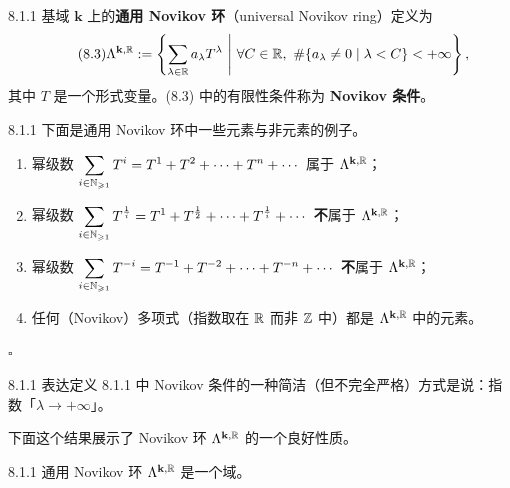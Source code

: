 \begin{wdefn}{8.1.1}
  基域 $\mathbf{k}$ 上的\textbf{通用 Novikov 环}（universal Novikov ring）定义为
  \begin{equation}\tag{8.3}
    \Lambda^{\mathbf{k},\R}:=\left\{\sum_{\lambda\in\R}a_\lambda T^\lambda
      \ \middle|\
      \forall C\in\R,\ \#\{a_\lambda\ne0\mid\lambda<C\}<+\infty\right\},
  \end{equation}
  其中 $T$ 是一个形式变量。(8.3) 中的有限性条件称为 \textbf{Novikov 条件}。
\end{wdefn}

\begin{wexam}{8.1.1}
  下面是通用 Novikov 环中一些元素与非元素的例子。
  \begin{enumerate}[label=(\roman*)]
    \item 幂级数 $\displaystyle\sum_{i\in\mathbb{N}_{\geqslant1}}T^i
          =T^1+T^2+\cdots+T^n+\cdots$ 属于 $\Lambda^{\mathbf{k},\mathbb{R}}$；
    \item 幂级数 $\displaystyle\sum_{i\in\mathbb{N}_{\geqslant1}}T^{\frac1i}
          =T^1+T^{\frac12}+\cdots+T^{\frac1i}+\cdots$ \textbf{不}属于
          $\Lambda^{\mathbf{k},\mathbb{R}}$；
    \item 幂级数 $\displaystyle\sum_{i\in\mathbb{N}_{\geqslant1}}T^{-i}
          =T^{-1}+T^{-2}+\cdots+T^{-n}+\cdots$ \textbf{不}属于 $\Lambda^{\mathbf{k},\mathbb{R}}$；
    \item 任何（Novikov）多项式（指数取在 $\mathbb{R}$ 而非 $\mathbb{Z}$ 中）都是 $\Lambda^{\mathbf{k},\mathbb{R}}$
          中的元素。
  \end{enumerate}
  \hfill$\square$
\end{wexam}

\begin{wrem}{8.1.1}
  表达定义 8.1.1 中 Novikov 条件的一种简洁（但不完全严格）方式是说：指数「$\lambda\to+\infty$」。
\end{wrem}

下面这个结果展示了 Novikov 环 $\Lambda^{\mathbf{k},\mathbb{R}}$ 的一个良好性质。

\begin{wlem}{8.1.1}
  通用 Novikov 环 $\Lambda^{\mathbf{k},\mathbb{R}}$ 是一个域。
\end{wlem}

